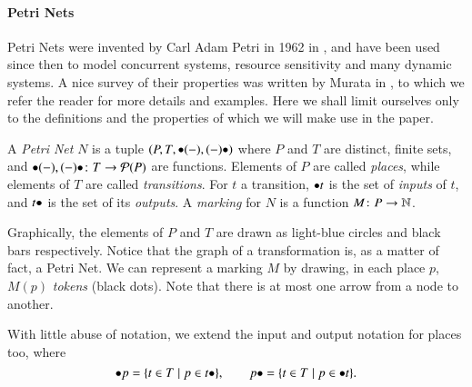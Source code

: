 

\paragraph{Petri Nets}\label{section: Petri Nets}

Petri Nets were invented by Carl Adam Petri in 1962 in \cite{petri_kommunikation_1962}, and have been used since then to model concurrent systems, resource sensitivity and many dynamic systems. A nice survey of their properties was written by Murata in \cite{murata_petri_1989}, to which we refer the reader for more details and examples. Here we shall limit ourselves only to the definitions and the properties of which we will make use in the paper.

\begin{definition}\label{def:Petri Net}
	A \emph{Petri Net} $N$ is a tuple $(P,T,\inp{(-)},\out{(-)})$ where $P$ and $T$ are distinct, finite sets, and  $\inp{(-)},\out{(-)}\colon T \to \parts{P}$ are functions. Elements of $P$ are called \emph{places}, while elements of $T$ are called \emph{transitions}. For $t$ a transition, $\inp t$ is the set of \emph{inputs} of $t$, and $\out t$ is the set of its \emph{outputs}.  A \emph{marking} for $N$ is a function $M \colon P \to \mathbb N$.
\end{definition}

Graphically, the elements of $P$ and $T$ are drawn as light-blue circles and black bars respectively. Notice that the graph of a transformation is, as a matter of fact, a Petri Net. We can represent a marking $M$ by drawing, in each place $p$, $M(p)$ \emph{tokens} (black dots). Note that there is at most one arrow from a node to another.

With little abuse of notation, we extend the input and output notation for places too, where
\[
\inp p = \{ t \in T \mid p \in \out{t}  \},  \qquad
\out p = \{ t \in T \mid p \in  \inp t \}.
\]

